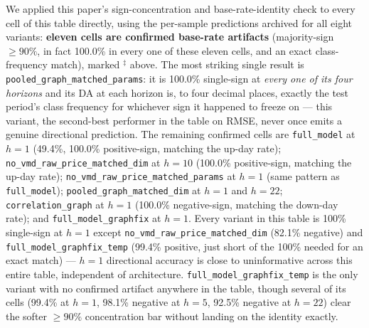 \documentclass[journal]{IEEEtran}
\begin{document}
We applied this paper's sign-concentration and base-rate-identity check to every cell of this table directly, using the per-sample predictions archived for all eight variants: \textbf{eleven cells are confirmed base-rate artifacts} (majority-sign $\geq90\%$, in fact 100.0\% in every one of these eleven cells, and an exact class-frequency match), marked $^{\ddagger}$ above. The most striking single result is \texttt{pooled\_graph\_matched\_params}: it is 100.0\% single-sign at \emph{every one of its four horizons} and its DA at each horizon is, to four decimal places, exactly the test period's class frequency for whichever sign it happened to freeze on --- this variant, the second-best performer in the table on RMSE, never once emits a genuine directional prediction. The remaining confirmed cells are \texttt{full\_model} at $h=1$ (49.4\%, 100.0\% positive-sign, matching the up-day rate); \texttt{no\_vmd\_raw\_price\_matched\_dim} at $h=10$ (100.0\% positive-sign, matching the up-day rate); \texttt{no\_vmd\_raw\_price\_matched\_params} at $h=1$ (same pattern as \texttt{full\_model}); \texttt{pooled\_graph\_matched\_dim} at $h=1$ and $h=22$; \texttt{correlation\_graph} at $h=1$ (100.0\% negative-sign, matching the down-day rate); and \texttt{full\_model\_graphfix} at $h=1$. Every variant in this table is 100\% single-sign at $h=1$ except \texttt{no\_vmd\_raw\_price\_matched\_dim} (82.1\% negative) and \texttt{full\_model\_graphfix\_temp} (99.4\% positive, just short of the 100\% needed for an exact match) --- $h=1$ directional accuracy is close to uninformative across this entire table, independent of architecture. \texttt{full\_model\_graphfix\_temp} is the only variant with no confirmed artifact anywhere in the table, though several of its cells (99.4\% at $h=1$, 98.1\% negative at $h=5$, 92.5\% negative at $h=22$) clear the softer $\geq90\%$ concentration bar without landing on the identity exactly.
\end{document}

